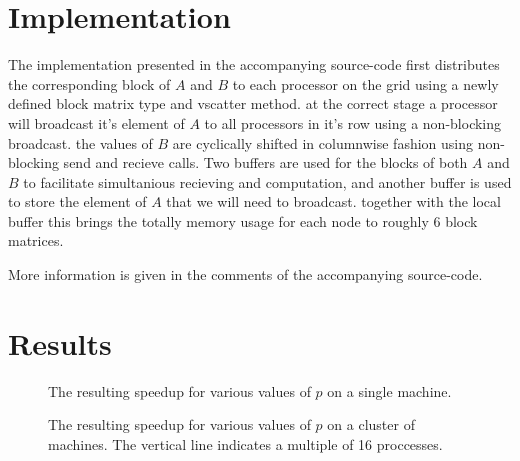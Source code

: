  \section{Implementation}
  \par The implementation presented in the accompanying source-code first distributes the corresponding block of $A$ and $B$ to each processor on the grid using a
  newly defined block matrix type and vscatter method.
  at the correct stage a processor will broadcast it's element of $A$ to all processors in it's row using a non-blocking broadcast. the values of $B$ are cyclically shifted in columnwise fashion using non-blocking
   send and recieve calls. Two buffers are used for the blocks of both $A$ and $B$ to facilitate simultanious recieving and computation, and another buffer is used to store the element of $A$ that we will need to broadcast.
   together with the local buffer this brings the totally memory usage for each node to roughly 6 block matrices.
   \par More information is given in the comments of the accompanying source-code.
   \newpage
  \section{Results}
  \begin{figure}[!Hhp]
    \centering
    
    \caption{The resulting speedup for various values of $p$ on a single machine.}
  \end{figure}
  \begin{figure}[!Hhp]
    \centering
    
    \caption{The resulting speedup for various values of $p$ on a cluster of machines. The vertical line indicates a multiple of 16 proccesses.}
  \end{figure}


